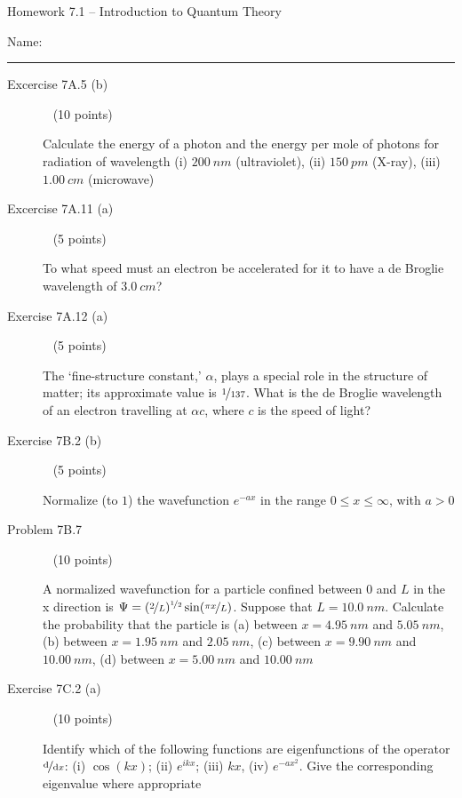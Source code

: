 \documentclass[10pt, letterpaper]{memoir}
\begin{document}
\begin{center}
	{\large Homework 7.1 -- Introduction to Quantum Theory}
\end{center}

Name: \rule[-.1mm]{15em}{0.1pt}

\begin{description}
	\item [Excercise 7A.5 (b)] ~ (10 points)
	
	Calculate the energy of a photon and the energy per mole of photons for radiation of wavelength (i) $200~nm$ (ultraviolet), (ii) $150~pm$ (X-ray), (iii) $1.00~cm$ (microwave)
		
	\vspace{10em}
	\item [Excercise 7A.11 (a)] ~ (5 points)
	
	To what speed must an electron be accelerated for it to have a de Broglie wavelength of $3.0~cm$?
	
	\vspace{8em}
	\item [Exercise 7A.12 (a)] ~ (5 points)
	
	The `fine-structure constant,' $\alpha$, plays a special role in the structure of matter; its approximate value is $\nicefrac{1}{137}$. What is the de Broglie wavelength of an electron travelling at $\alpha c$, where $c$ is the speed of light?
	
	\vspace{10em}
	\item [Exercise 7B.2 (b)] ~ (5 points)
	
	Normalize (to $1$) the wavefunction $e^{-ax}$ in the range $0\leq x\leq\infty$, with $a>0$
	
	\vspace{15em}
	\item [Problem 7B.7] ~ (10 points)
	
	A normalized wavefunction for a particle confined between $0$ and $L$ in the x direction is $\Psi=(\nicefrac{2}{L})^{\nicefrac{1}{2}}\sin(\nicefrac{\pi x}{L})$. Suppose that $L = 10.0~nm$. Calculate the probability that the particle is (a) between $x=4.95~nm$ and $5.05~nm$, (b) between $x=1.95~nm$ and $2.05~nm$, (c) between $x=9.90~nm$ and $10.00~nm$, (d) between $x=5.00~nm$ and $10.00~nm$
	
	\vspace{15em}
	\item [Exercise 7C.2 (a)] ~ (10 points)
	
	Identify which of the following functions are eigenfunctions of the operator $\nicefrac{\mathrm{d}}{\mathrm{d}x}$: (i) $\cos(kx)$; (ii) $e^{ikx}$; (iii) $kx$, (iv) $e^{-ax^2}$. Give the corresponding eigenvalue where appropriate
	

\end{description}
\end{document}
